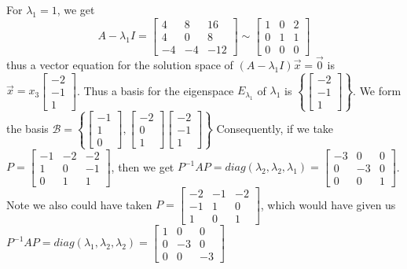 \documentclass[10pt,letter]{article}
\begin{document}
For $\lambda_1=1$, we get $$A-\lambda_1I=\begin{bmatrix}4&8&16\\4&0&8\\-4&-4&-12\end{bmatrix}\sim\begin{bmatrix}1&0&2\\0&1&1\\0&0&0\end{bmatrix}$$ thus a vector equation for the solution space of $(A-\lambda_1I)\vec{x}=\vec{0}$ is $\vec{x}=x_3\begin{bmatrix}-2\\-1\\1\end{bmatrix}$. Thus a basis for the eigenspace $E_{\lambda_1}$ of $\lambda_1$ is $\left\{\begin{bmatrix}-2\\-1\\1\end{bmatrix}\right\}$. We form the basis $\mathcal{B}=\left\{\begin{bmatrix}-1\\1\\0\end{bmatrix},\begin{bmatrix}-2\\0\\1\end{bmatrix}\begin{bmatrix}-2\\-1\\1\end{bmatrix}\right\}$ Consequently, if we take $P=\begin{bmatrix}-1&-2&-2\\1&0&-1\\0&1&1\end{bmatrix}$, then we get $P^{-1}AP=diag(\lambda_2,\lambda_2,\lambda_1)=\begin{bmatrix}-3&0&0\\0&-3&0\\0&0&1\end{bmatrix}$. Note we also could have taken $P=\begin{bmatrix}-2&-1&-2\\-1&1&0\\1&0&1\end{bmatrix}$, which would have given us $P^{-1}AP=diag(\lambda_1,\lambda_2,\lambda_2)=\begin{bmatrix}1&0&0\\0&-3&0\\0&0&-3\end{bmatrix}$
\end{document}
